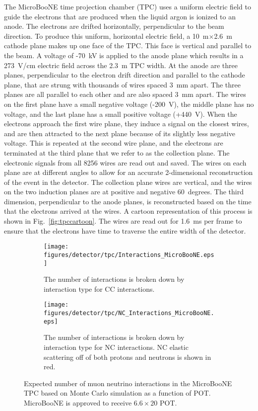     The MicroBooNE time projection chamber (TPC) uses a uniform electric field
    to guide the electrons that are produced when the liquid argon is ionized
    to an anode. The electrons are drifted horizontally, perpendicular to the
    beam direction. To produce this uniform, horizontal electric field, a
    10~m$\times$2.6~m cathode plane makes up one face of the TPC. This face is
    vertical and parallel to the beam. A voltage of -70~kV is applied to the
    anode plane which results in a 273~V/cm electric field across the 2.3~m TPC
    width.  At the anode are three planes, perpendicular to the electron drift
    direction and parallel to the cathode plane, that are strung with thousands
    of wires spaced 3~mm apart.  The three planes are all parallel to each
    other and are also spaced 3~mm apart.  The wires on the first plane have a
    small negative voltage (-200~V), the middle plane has no voltage, and the
    last plane has a small positive voltage (+440~V). When the electrons
    approach the first wire plane, they induce a signal on the closest wires,
    and are then attracted to the next plane because of its slightly less
    negative voltage. This is repeated at the second wire plane, and the
    electrons are terminated at the third plane that we refer to as the
    collection plane. The electronic signals from all 8256 wires are read out
    and saved. The wires on each plane are at different angles to allow for an
    accurate 2-dimensional reconstruction of the event in the detector. The
    collection plane wires are vertical, and the wires on the two induction
    planes are at positive and negative 60~degrees. The third dimension,
    perpendicular to the anode planes, is reconstructed based on the time that
    the electrons arrived at the wires. A cartoon representation of this
    process is shown in Fig.~\ref{fig:tpccartoon}. The wires are read out for
    1.6~ms per frame to ensure that the electrons have time to traverse the
    entire width of the detector.

    \begin{figure}[h]
      \centering
      \begin{subfigure}[t]{2.5in}
        \texttt{[image: figures/detector/tpc/Interactions\_MicroBooNE.eps]}
        \caption{The number of interactions is broken down by interaction type for CC interactions.}
        \label{fig:interactionsal}
      \end{subfigure}
      \hspace{2pt}
      \begin{subfigure}[t]{2.5in}
        \texttt{[image: figures/detector/tpc/NC\_Interactions\_MicroBooNE.eps]}
        \caption{The number of interactions is broken down by interaction type
        for NC interactions. NC elastic scattering off of both protons and
        neutrons is shown in red.}
        \label{fig:interactionsnc}
      \end{subfigure}
      \caption{Expected number of muon neutrino interactions in the
      MicroBooNE TPC based on Monte Carlo simulation as a function of POT.
      MicroBooNE is approved to receive $6.6\times 20$ POT.}
      \label{fig:interactions}
    \end{figure}

